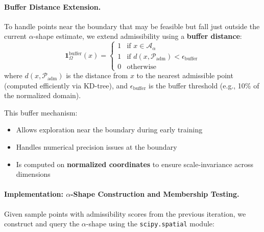 \paragraph{Buffer Distance Extension.}
To handle points near the boundary that may be feasible but fall just outside the current $\alpha$-shape estimate, we extend admissibility using a \textbf{buffer distance}:
\begin{equation}
    \mathbf{1}_{\Omega}^{\text{buffer}}(x) = \begin{cases}
        1 & \text{if } x \in \mathcal{A}_\alpha \\
        1 & \text{if } d(x, \mathcal{P}_{\text{adm}}) < \epsilon_{\text{buffer}} \\
        0 & \text{otherwise}
    \end{cases}
\end{equation}
where $d(x, \mathcal{P}_{\text{adm}})$ is the distance from $x$ to the nearest admissible point (computed efficiently via KD-tree), and $\epsilon_{\text{buffer}}$ is the buffer threshold (e.g., 10\% of the normalized domain).

This buffer mechanism:
\begin{itemize}
    \item Allows exploration near the boundary during early training
    \item Handles numerical precision issues at the boundary
    \item Is computed on \textbf{normalized coordinates} to ensure scale-invariance across dimensions
\end{itemize}

\paragraph{Implementation: $\alpha$-Shape Construction and Membership Testing.}
Given sample points with admissibility scores from the previous iteration, we construct and query the $\alpha$-shape using the \texttt{scipy.spatial} module:

